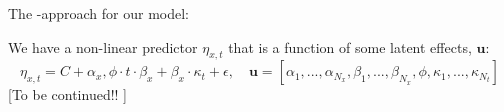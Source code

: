 The \inlabru-approach for our model:

We have a non-linear predictor $\eta_{x,t}$ that is a function of some latent effects, $\textbf{u}$:
\begin{equation}
    \eta_{x,t} = C + \alpha_x, \phi\cdot t\cdot \beta_x + \beta_x\cdot\kappa_t + \epsilon, \quad \textbf{u} = [\alpha_1,...,\alpha_{N_x},\beta_1,...,\beta_{N_x},\phi,\kappa_1,...,\kappa_{N_t}]
\end{equation}
[To be continued!! ]
